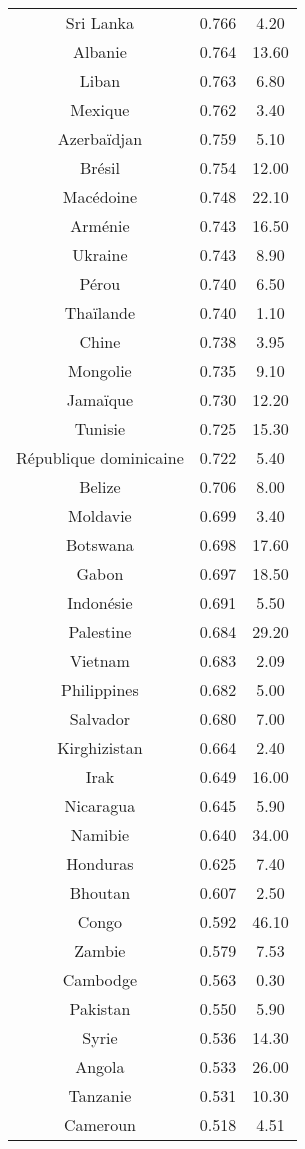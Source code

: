 \documentclass[paper=a4, fontsize=11pt]{scrartcl} %
\numberwithin{equation}{section} %
\numberwithin{figure}{section} %
\numberwithin{table}{section} %
\begin{document}
\begin{longtable}{|c|c|c|}
Sri Lanka	& 0.766 & 4.20 \\
Albanie	& 0.764 & 13.60 \\
Liban	& 0.763 & 6.80 \\
Mexique	& 0.762 & 3.40 \\
Azerbaïdjan	& 0.759 & 5.10 \\
Brésil	& 0.754 & 12.00 \\
Macédoine	& 0.748 & 22.10 \\
Arménie	& 0.743 & 16.50 \\
Ukraine	& 0.743 & 8.90 \\
Pérou	& 0.740 & 6.50 \\
Thaïlande	& 0.740 & 1.10 \\
Chine	& 0.738 & 3.95 \\
Mongolie	& 0.735 & 9.10 \\
Jamaïque	& 0.730 & 12.20 \\
Tunisie	& 0.725 & 15.30 \\
République dominicaine	& 0.722 & 5.40 \\
Belize	& 0.706 & 8.00 \\
Moldavie	& 0.699 & 3.40 \\
Botswana	& 0.698 & 17.60 \\
Gabon	& 0.697 & 18.50 \\
Indonésie	& 0.691 & 5.50 \\
Palestine	& 0.684 & 29.20 \\
Vietnam	& 0.683 & 2.09 \\
Philippines	& 0.682 & 5.00 \\
Salvador	& 0.680 & 7.00 \\
Kirghizistan	& 0.664 & 2.40 \\
Irak	& 0.649 & 16.00 \\
Nicaragua	& 0.645 & 5.90 \\
Namibie	& 0.640 & 34.00 \\
Honduras	& 0.625 & 7.40 \\
Bhoutan	& 0.607 & 2.50 \\
Congo	& 0.592 & 46.10 \\
Zambie	& 0.579 & 7.53 \\
Cambodge	& 0.563 & 0.30 \\
Pakistan	& 0.550 & 5.90 \\
Syrie	& 0.536 & 14.30 \\
Angola	& 0.533 & 26.00 \\
Tanzanie	& 0.531 & 10.30 \\
Cameroun	& 0.518 & 4.51 \\

\end{longtable}
\end{document}
